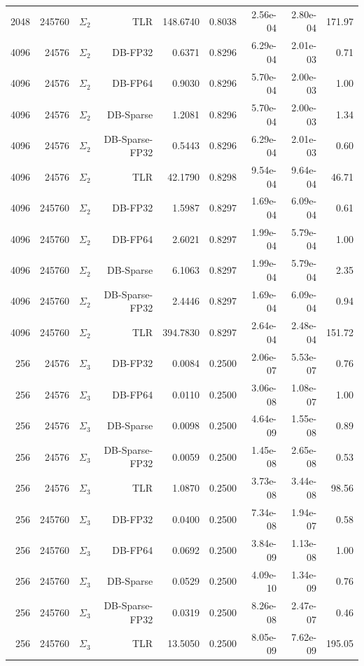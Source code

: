 \begin{tabular}{|r|r|r|r|r|r|r|r|r|}
  2048 & 245760 & $\Sigma_2$ & TLR & 148.6740 & 0.8038 & 2.56e-04 & 2.80e-04 & 171.97 \\
  4096 & 24576 & $\Sigma_2$ & DB-FP32 & 0.6371 & 0.8296 & 6.29e-04 & 2.01e-03 & 0.71 \\
  4096 & 24576 & $\Sigma_2$ & DB-FP64 & 0.9030 & 0.8296 & 5.70e-04 & 2.00e-03 & 1.00 \\
  4096 & 24576 & $\Sigma_2$ & DB-Sparse & 1.2081 & 0.8296 & 5.70e-04 & 2.00e-03 & 1.34 \\
  4096 & 24576 & $\Sigma_2$ & DB-Sparse-FP32 & 0.5443 & 0.8296 & 6.29e-04 & 2.01e-03 & 0.60 \\
  4096 & 24576 & $\Sigma_2$ & TLR & 42.1790 & 0.8298 & 9.54e-04 & 9.64e-04 & 46.71 \\
  4096 & 245760 & $\Sigma_2$ & DB-FP32 & 1.5987 & 0.8297 & 1.69e-04 & 6.09e-04 & 0.61 \\
  4096 & 245760 & $\Sigma_2$ & DB-FP64 & 2.6021 & 0.8297 & 1.99e-04 & 5.79e-04 & 1.00 \\
  4096 & 245760 & $\Sigma_2$ & DB-Sparse & 6.1063 & 0.8297 & 1.99e-04 & 5.79e-04 & 2.35 \\
  4096 & 245760 & $\Sigma_2$ & DB-Sparse-FP32 & 2.4446 & 0.8297 & 1.69e-04 & 6.09e-04 & 0.94 \\
  4096 & 245760 & $\Sigma_2$ & TLR & 394.7830 & 0.8297 & 2.64e-04 & 2.48e-04 & 151.72 \\
  256 & 24576 & $\Sigma_3$ & DB-FP32 & 0.0084 & 0.2500 & 2.06e-07 & 5.53e-07 & 0.76 \\
  256 & 24576 & $\Sigma_3$ & DB-FP64 & 0.0110 & 0.2500 & 3.06e-08 & 1.08e-07 & 1.00 \\
  256 & 24576 & $\Sigma_3$ & DB-Sparse & 0.0098 & 0.2500 & 4.64e-09 & 1.55e-08 & 0.89 \\
  256 & 24576 & $\Sigma_3$ & DB-Sparse-FP32 & 0.0059 & 0.2500 & 1.45e-08 & 2.65e-08 & 0.53 \\
  256 & 24576 & $\Sigma_3$ & TLR & 1.0870 & 0.2500 & 3.73e-08 & 3.44e-08 & 98.56 \\
  256 & 245760 & $\Sigma_3$ & DB-FP32 & 0.0400 & 0.2500 & 7.34e-08 & 1.94e-07 & 0.58 \\
  256 & 245760 & $\Sigma_3$ & DB-FP64 & 0.0692 & 0.2500 & 3.84e-09 & 1.13e-08 & 1.00 \\
  256 & 245760 & $\Sigma_3$ & DB-Sparse & 0.0529 & 0.2500 & 4.09e-10 & 1.34e-09 & 0.76 \\
  256 & 245760 & $\Sigma_3$ & DB-Sparse-FP32 & 0.0319 & 0.2500 & 8.26e-08 & 2.47e-07 & 0.46 \\
  256 & 245760 & $\Sigma_3$ & TLR & 13.5050 & 0.2500 & 8.05e-09 & 7.62e-09 & 195.05 \\

\end{tabular}
